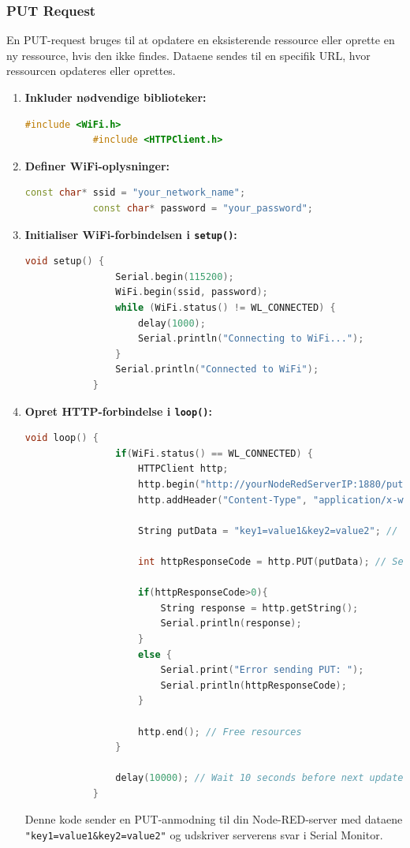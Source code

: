 \documentclass[12pt,a4paper]{book}
\begin{document}
	\subsubsection*{PUT Request}
	En PUT-request bruges til at opdatere en eksisterende ressource eller oprette en ny ressource, hvis den ikke findes. Dataene sendes til en specifik URL, hvor ressourcen opdateres eller oprettes.
	
	\begin{enumerate}
		\item \textbf{Inkluder nødvendige biblioteker:}
		\begin{lstlisting}[language=C++, caption=Include necessary libraries]
			#include <WiFi.h>
			#include <HTTPClient.h>
		\end{lstlisting}
		
		\item \textbf{Definer WiFi-oplysninger:}
		\begin{lstlisting}[language=C++, caption=Define WiFi credentials]
			const char* ssid = "your_network_name";
			const char* password = "your_password";
		\end{lstlisting}
		
		\item \textbf{Initialiser WiFi-forbindelsen i \texttt{setup()}:}
		\begin{lstlisting}[language=C++, caption=Initialize WiFi connection in setup()]
			void setup() {
				Serial.begin(115200);
				WiFi.begin(ssid, password);
				while (WiFi.status() != WL_CONNECTED) {
					delay(1000);
					Serial.println("Connecting to WiFi...");
				}
				Serial.println("Connected to WiFi");
			}
		\end{lstlisting}
		
		\item \textbf{Opret HTTP-forbindelse i \texttt{loop()}:}
		\begin{lstlisting}[language=C++, caption=Create HTTP connection in loop()]
			void loop() {
				if(WiFi.status() == WL_CONNECTED) {
					HTTPClient http;
					http.begin("http://yourNodeRedServerIP:1880/putdata"); // Specify the URL
					http.addHeader("Content-Type", "application/x-www-form-urlencoded"); // Set content type
					
					String putData = "key1=value1&key2=value2"; // Your PUT data
					
					int httpResponseCode = http.PUT(putData); // Send PUT request
					
					if(httpResponseCode>0){
						String response = http.getString();
						Serial.println(response);
					}
					else {
						Serial.print("Error sending PUT: ");
						Serial.println(httpResponseCode);
					}
					
					http.end(); // Free resources
				}
				
				delay(10000); // Wait 10 seconds before next update
			}
		\end{lstlisting}
		Denne kode sender en PUT-anmodning til din Node-RED-server med dataene \texttt{"key1=value1\&key2=value2"} og udskriver serverens svar i Serial Monitor.
	\end{enumerate}
	
\end{document}
